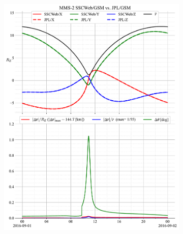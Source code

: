 \documentclass[draft]{agujournal2019}
\begin{document}
\begin{figure}[h]
\begin{subfigure}[b]{0.49\textwidth}
         \includegraphics[width=\textwidth]{code/figures/ephemeris/MMS-2_SSCWeb-GSM_vs_JPL-GSM.pdf}
     \end{subfigure}
     \caption{}
     \label{fig:mms-2}
\end{figure}

\clearpage



\end{document}
